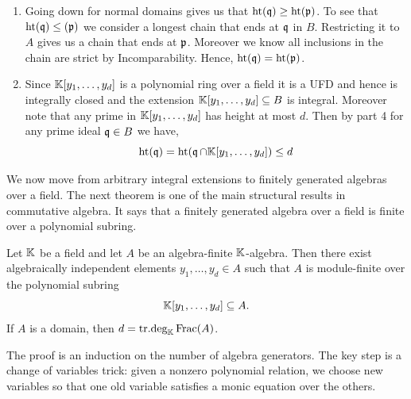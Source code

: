 \documentclass[Notebook.tex]{subfiles}
\begin{document}
\begin{solution}
\begin{enumerate}
        So we have a chain of length $n+1$ in $S$
        \[\fq_0 \subsetneq \fq_1 \subsetneq \cdots \subsetneq \fq_n = \fp_n R[x] \subsetneq \fp_n R[x] + \langle x \rangle\]
        so $\dim(S) \geq \dim(R) + 1$. 

        \item Going down for normal domains gives us that $\operatorname{\text{ht}}(\operatorname{\mathfrak{q}}) \geq \operatorname{\text{ht}}(\operatorname{\mathfrak{p}})$. To see that $\operatorname{\text{ht}}(\operatorname{\mathfrak{q}}) \leq (\operatorname{\mathfrak{p}})$ we consider a longest chain that ends at $\operatorname{\mathfrak{q}}$ in $B$. Restricting it to $A$ gives us a chain that ends at $\operatorname{\mathfrak{p}}$. Moreover we know all inclusions in the chain are strict by Incomparability. 
        Hence, $\operatorname{\text{ht}}(\operatorname{\mathfrak{q}}) = \operatorname{\text{ht}}(\operatorname{\mathfrak{p}})$. 

        \item Since $\mathbb K[y_1, \ldots, y_d]$ is a polynomial ring over a field it is a UFD and hence is integrally closed and the extension $\mathbb K[y_1, \ldots, y_d] \subseteq B$ is integral. Moreover note that any prime in $\mathbb K[y_1, \ldots, y_d]$ has height at most $d$. Then by part 4 for any prime ideal $\operatorname{\mathfrak{q}} \in B$ we have, 
        \[\operatorname{\text{ht}}(\operatorname{\mathfrak{q}}) = \operatorname{\text{ht}}(\operatorname{\mathfrak{q}} \cap \mathbb K[y_1, \ldots, y_d]) \leq d\]
    \end{enumerate}
\end{solution}
 
\newpage

\hrulefill

We now move from arbitrary integral extensions to finitely generated algebras over a field. The next theorem is one of the main structural results in commutative algebra. It says that a finitely generated algebra over a field is finite over a polynomial subring.

\begin{theorem}
Let $\mathbb K$ be a field and let $A$ be an algebra-finite $\mathbb K$-algebra. Then there exist algebraically independent elements $y_1,\ldots,y_d\in A$ such that $A$ is module-finite over the polynomial subring
\[
\mathbb K[y_1,\ldots,y_d]\subseteq A.
\]
If $A$ is a domain, then $d=\operatorname{\text{tr.deg}}_{\mathbb K}\text{Frac}(A)$.
\end{theorem}

The proof is an induction on the number of algebra generators. The key step is a change of variables trick: given a nonzero polynomial relation, we choose new variables so that one old variable satisfies a monic equation over the others.

\hrulefill

\newpage 
\end{document}
